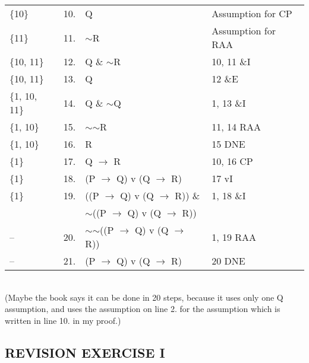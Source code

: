 \documentclass[a4paper,12pt]{article}
\newcommand{\mra}{$\rightarrow$ }
\newcommand{\ms}{$\sim$}
\begin{document}
\begin{enumerate}[label=\arabic*,leftmargin=*]
\begin{enumerate}[label=\arabic*.]
\begin{minipage}{\textwidth}
\begin{tabular}{l l l l}
                        \{10\} & 10. & Q & Assumption for CP\\
                        \{11\} & 11. & \ms R & Assumption for RAA\\
                        \{10, 11\} & 12. & Q \& \ms R & 10, 11 \&I\\
                        \{10, 11\} & 13. & Q & 12 \&E\\
                        \{1, 10, 11\} & 14. & Q \& \ms Q & 1, 13 \&I\\
                        \{1, 10\} & 15. & \ms \ms R & 11, 14 RAA\\
                        \{1, 10\} & 16. & R & 15 DNE\\
                        \{1\} & 17. & Q \mra R & 10, 16 CP\\
                        \{1\} & 18. & (P \mra Q) v (Q \mra R) & 17 vI\\
                        \{1\} & 19. & ((P \mra Q) v (Q \mra R)) \& & 1, 18 \&I\\
                         & & \ms ((P \mra Q) v (Q \mra R)) & \\
                        -- & 20. & \ms \ms ((P \mra Q) v (Q \mra R)) & 1, 19 RAA\\
                        -- & 21. & (P \mra Q) v (Q \mra R) & 20 DNE\\
                    \end{tabular}\\
                    (Maybe the book says it can be done in 20 steps, because it uses only one Q assumption, and uses the assumption on line 2. for the assumption which is written in line 10. in my proof.)
                \end{minipage}

        \end{enumerate}
    \end{enumerate}

    \subsection*{REVISION EXERCISE I}
\end{document}
